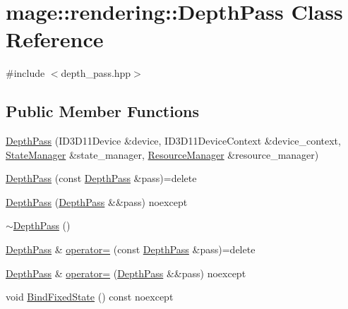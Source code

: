 \hypertarget{classmage_1_1rendering_1_1_depth_pass}{}\section{mage\+:\+:rendering\+:\+:Depth\+Pass Class Reference}
\label{classmage_1_1rendering_1_1_depth_pass}


{\ttfamily \#include $<$depth\+\_\+pass.\+hpp$>$}

\subsection*{Public Member Functions}
\begin{DoxyCompactItemize}
\item 
\mbox{\hyperlink{classmage_1_1rendering_1_1_depth_pass_a0be584f68a1a6b4d3b63616c449e903d}{Depth\+Pass}} (I\+D3\+D11\+Device \&device, I\+D3\+D11\+Device\+Context \&device\+\_\+context, \mbox{\hyperlink{classmage_1_1rendering_1_1_state_manager}{State\+Manager}} \&state\+\_\+manager, \mbox{\hyperlink{classmage_1_1rendering_1_1_resource_manager}{Resource\+Manager}} \&resource\+\_\+manager)
\item 
\mbox{\hyperlink{classmage_1_1rendering_1_1_depth_pass_aea4f5634f65a8f5181b73e9817d499db}{Depth\+Pass}} (const \mbox{\hyperlink{classmage_1_1rendering_1_1_depth_pass}{Depth\+Pass}} \&pass)=delete
\item 
\mbox{\hyperlink{classmage_1_1rendering_1_1_depth_pass_a7157b0a6480a1fca6001e4eb93b4e5fd}{Depth\+Pass}} (\mbox{\hyperlink{classmage_1_1rendering_1_1_depth_pass}{Depth\+Pass}} \&\&pass) noexcept
\item 
\mbox{\hyperlink{classmage_1_1rendering_1_1_depth_pass_a5ad944e2a8f93e2f4bf5f9f97641e003}{$\sim$\+Depth\+Pass}} ()
\item 
\mbox{\hyperlink{classmage_1_1rendering_1_1_depth_pass}{Depth\+Pass}} \& \mbox{\hyperlink{classmage_1_1rendering_1_1_depth_pass_a10cc86e94eb5425f0323b989c33514b7}{operator=}} (const \mbox{\hyperlink{classmage_1_1rendering_1_1_depth_pass}{Depth\+Pass}} \&pass)=delete
\item 
\mbox{\hyperlink{classmage_1_1rendering_1_1_depth_pass}{Depth\+Pass}} \& \mbox{\hyperlink{classmage_1_1rendering_1_1_depth_pass_a937bc6669a2bd856e7ff9c396e0afe77}{operator=}} (\mbox{\hyperlink{classmage_1_1rendering_1_1_depth_pass}{Depth\+Pass}} \&\&pass) noexcept
\item 
void \mbox{\hyperlink{classmage_1_1rendering_1_1_depth_pass_a0123d8dbf23e7909dbb22e9bc37785a1}{Bind\+Fixed\+State}} () const noexcept

\end{DoxyCompactItemize}
